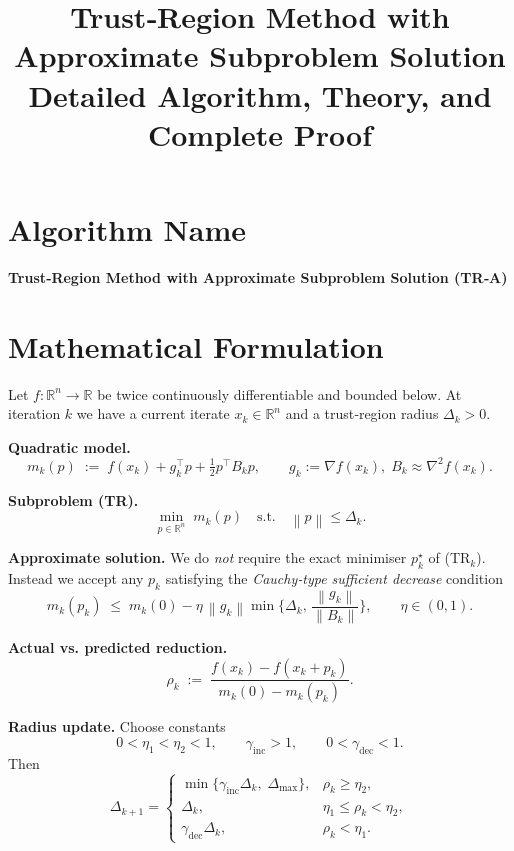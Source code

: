 \documentclass[11pt]{article}
\newcommand{\norm}[1]{\left\lVert#1\right\rVert}
\newcommand{\R}{\mathbb{R}}
\begin{document}
\title{Trust‑Region Method with Approximate Subproblem Solution \\ Detailed Algorithm, Theory, and Complete Proof}
\author{}
\date{}
\maketitle

\tableofcontents
\newpage

\section*{Algorithm Name}
\begin{center}
\textbf{Trust‑Region Method with Approximate Subproblem Solution (TR‑A)}
\end{center}

\section*{Mathematical Formulation}
Let $f:\R^{n}\rightarrow\R$ be twice continuously differentiable and bounded below.  
At iteration $k$ we have a current iterate $x_k\in\R^{n}$ and a trust‑region radius $\Delta_k>0$.  

\medskip
\noindent\textbf{Quadratic model.}
\[
m_k(p)\;:=\;f(x_k)+g_k^{\top}p+\tfrac12 p^{\top}B_k p,
\qquad 
g_k:=\nabla f(x_k),\;
B_k\approx \nabla^{2}f(x_k).
\]

\noindent\textbf{Subproblem (TR).}
\[
\min_{p\in\R^{n}}\; m_k(p)\quad\text{s.t.}\quad \norm{p}\le \Delta_k .
\tag{TR$_k$}
\]

\noindent\textbf{Approximate solution.}
We do \emph{not} require the exact minimiser $p_k^{\star}$ of (TR$_k$).  
Instead we accept any $p_k$ satisfying the \emph{Cauchy‑type sufficient decrease} condition
\[
m_k(p_k)\;\le\; m_k(0)-\eta\,\norm{g_k}\min\!\Big\{\Delta_k,\,
\frac{\norm{g_k}}{\norm{B_k}}\Big\},
\qquad \eta\in(0,1).
\tag{A1}
\]

\noindent\textbf{Actual vs. predicted reduction.}
\[
\rho_k \;:=\;
\frac{f(x_k)-f(x_k+p_k)}{m_k(0)-m_k(p_k)} .
\tag{A2}
\]

\noindent\textbf{Radius update.} Choose constants
\[
0<\eta_1<\eta_2<1,\qquad
\gamma_{\text{inc}}>1,\qquad
0<\gamma_{\text{dec}}<1 .
\]
Then
\[
\Delta_{k+1}= 
\begin{cases}
\min\{\gamma_{\text{inc}}\Delta_k,\;\Delta_{\max}\}, & \rho_k\ge \eta_2,\\[4pt]
\Delta_k, & \eta_1\le\rho_k<\eta_2,\\[4pt]
\gamma_{\text{dec}}\Delta_k, & \rho_k<\eta_1 .
\end{cases}
\tag{A3}
\]
\end{document}

